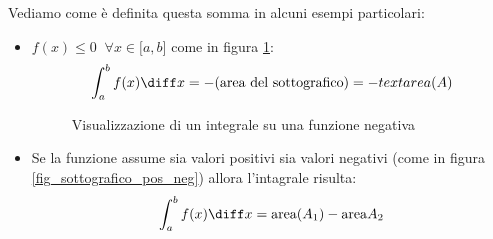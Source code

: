 Vediamo come è definita questa somma in alcuni esempi particolari:
\begin{itemize}
	\item $f(x) \leq 0 \;\; \forall x \in \mathbb[a, b]$ come in figura 
        \ref{fig_sottografico_neg}:
		\begin{equation*}
			\int_a^b f(x) \diff x = - (\text{area del sottografico}) = 
            -text{area}(A)
		\end{equation*}

		\begin{figure}[h]
			\begin{center}


			\end{center}
			\caption{Visualizzazione di un integrale su una funzione negativa}
			\label{fig_sottografico_neg}

		\end{figure}




	\item Se la funzione assume sia valori positivi sia valori negativi 
        (come in figura \ref{fig_sottografico_pos_neg}) allora l'intagrale 
        risulta:
		\begin{equation*}
			\int_a^b f(x) \diff x = \text{area}(A_1) - \text{area}{A_2}
		\end{equation*}


		\begin{figure}[h]
			\begin{center}


\end{center}
\end{figure}
\end{itemize}
